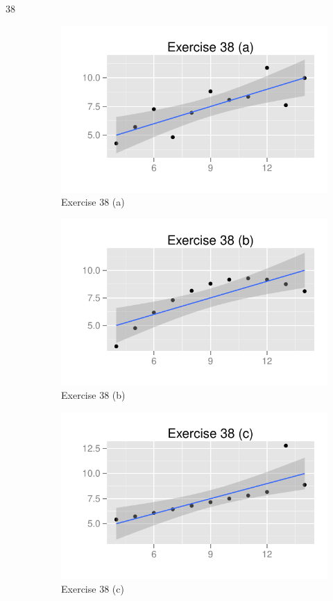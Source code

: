 \documentclass[letterpaper, landscape]{exam}
\begin{document}
\begin{description}
      \item[38]
        \begin{figure}[H]
          \centering
          \includegraphics{figures/ex38a.pdf}
          \caption{Exercise 38 (a)}
        \end{figure}

        \begin{figure}[H]
          \centering
          \includegraphics{figures/ex38b.pdf}
          \caption{Exercise 38 (b)}
        \end{figure}

        \begin{figure}[H]
          \centering
          \includegraphics{figures/ex38c.pdf}
          \caption{Exercise 38 (c)}
        \end{figure}


\end{description}
\end{document}
